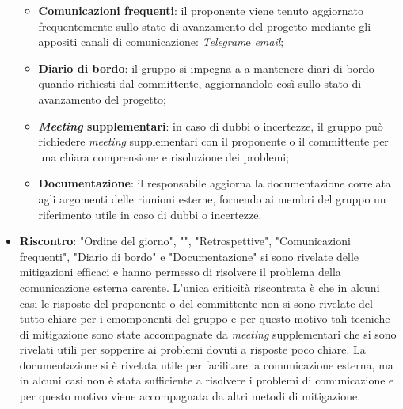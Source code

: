 \begin{itemize}
\begin{itemize}
		      \item \textbf{Comunicazioni frequenti}: il proponente viene tenuto
		            aggiornato frequentemente sullo stato di avanzamento del
		            progetto mediante gli appositi canali di comunicazione:
		            \textit{Telegram}\g e \textit{email};

		      \item \textbf{Diario di bordo}: il gruppo si impegna a a mantenere 
			  		diari di bordo quando richiesti dal committente, aggiornandolo 
					così sullo stato di avanzamento del progetto;

		      \item \textbf{\textit{Meeting} supplementari}: in caso di dubbi o 
			  		incertezze, il gruppo può richiedere \textit{meeting} supplementari 
					con il proponente o il committente per una chiara comprensione e 
					risoluzione dei problemi;

		      \item \textbf{Documentazione}: il responsabile aggiorna la documentazione 
			  		correlata agli argomenti delle riunioni esterne, fornendo ai membri 
					del gruppo un riferimento utile in caso di dubbi o incertezze.
	      \end{itemize}

	\item \textbf{Riscontro}: "Ordine del giorno", "", "Retrospettive", "Comunicazioni frequenti", "Diario di bordo" e "Documentazione" 
	si sono rivelate delle mitigazioni efficaci e hanno permesso di risolvere il problema della comunicazione esterna carente. 
	L'unica criticità riscontrata è che in alcuni casi le risposte del proponente o del committente non si sono rivelate del tutto chiare per i cmomponenti del gruppo e per questo motivo tali
	tecniche di mitigazione sono state accompagnate da \textit{meeting} supplementari che si sono rivelati utili per sopperire ai problemi dovuti a risposte poco chiare.
	La documentazione si è rivelata utile per facilitare la comunicazione esterna, ma in alcuni casi non è stata sufficiente a risolvere i problemi di comunicazione e per questo motivo viene accompagnata da altri metodi di mitigazione.
\end{itemize}
